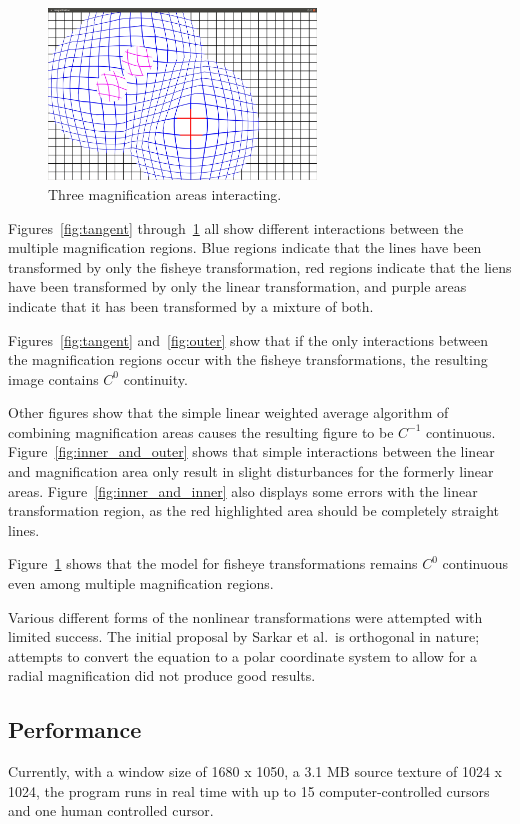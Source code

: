 \documentclass[annual]{acmsiggraph}
\begin{document}
\begin{figure}
	\centering
	\includegraphics[width=2.8in]{figures/multiple.jpg}
	\caption{Three magnification areas interacting.}
	\label{fig:multiple}
\end{figure}

Figures~\ref{fig:tangent} through~\ref{fig:multiple} all show different interactions 
between the multiple magnification regions. Blue regions indicate that the lines
have been transformed by only the fisheye transformation, red regions indicate
that the liens have been transformed by only the linear transformation, and
purple areas indicate that it has been transformed by a mixture of both.

Figures~\ref{fig:tangent} and~\ref{fig:outer} show that if the only interactions 
between the magnification regions occur with the fisheye transformations, the 
resulting image contains $C^0$ continuity.

Other figures show that the simple linear weighted average algorithm of combining
magnification areas causes the resulting figure to be $C^{-1}$ continuous. 
Figure~\ref{fig:inner_and_outer} shows that simple interactions between the linear
and magnification area only result in slight disturbances for the formerly 
linear areas. Figure~\ref{fig:inner_and_inner} also displays some errors
with the linear transformation region, as the red highlighted area should
be completely straight lines.

Figure~\ref{fig:multiple} shows that the model for fisheye transformations
remains $C^0$ continuous even among multiple magnification regions.

Various different forms of the nonlinear transformations were attempted
with limited success. The initial proposal by Sarkar et al.\ is orthogonal
in nature; attempts to convert the equation to a polar coordinate system
to allow for a radial magnification did not produce good results. 

\subsection{Performance}
Currently, with a window size of 1680 x 1050, a 3.1 MB source texture of 
1024 x 1024, the program runs in real time with up to 15 computer-controlled
cursors and one human controlled cursor.
\end{document}
